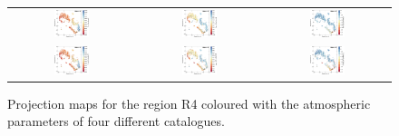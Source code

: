 \documentclass{aa}
\begin{document}
\begin{appendix}
\begin{figure}[htbp]
\begin{tabular}{ccc}
        \includegraphics[width=0.3\textwidth]{Plots/tsne_params/tsne_R4_Teff_StarHorse2.pdf} &
        \includegraphics[width=0.3\textwidth]{Plots/tsne_params/tsne_R4_logg_StarHorse2.pdf} &
        \includegraphics[width=0.3\textwidth]{Plots/tsne_params/tsne_R4_FeH_StarHorse2.pdf} \\
        \includegraphics[width=0.3\textwidth]{Plots/tsne_params/tsne_R4_Teff_XP-LAMOST.pdf} &
        \includegraphics[width=0.3\textwidth]{Plots/tsne_params/tsne_R4_logg_XP-LAMOST.pdf} &
        \includegraphics[width=0.3\textwidth]{Plots/tsne_params/tsne_R4_FeH_XP-LAMOST.pdf} \\
    \end{tabular}
    \caption{Projection maps for the region R4 coloured with the atmospheric parameters of four different catalogues.}
\end{figure}


\end{appendix}
\end{document}
